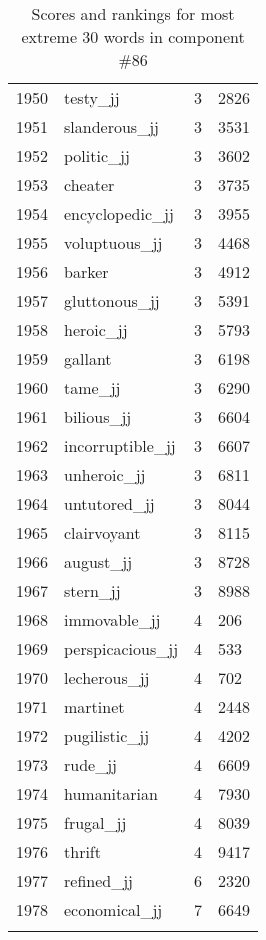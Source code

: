 \begin{longtable}[!htbp]{| rlr@{.}l |}
    1950 & testy\_jj & 3 & 2826 \\
    1951 & slanderous\_jj & 3 & 3531 \\
    1952 & politic\_jj & 3 & 3602 \\
    1953 & cheater & 3 & 3735 \\
    1954 & encyclopedic\_jj & 3 & 3955 \\
    1955 & voluptuous\_jj & 3 & 4468 \\
    1956 & barker & 3 & 4912 \\
    1957 & gluttonous\_jj & 3 & 5391 \\
    1958 & heroic\_jj & 3 & 5793 \\
    1959 & gallant & 3 & 6198 \\
    1960 & tame\_jj & 3 & 6290 \\
    1961 & bilious\_jj & 3 & 6604 \\
    1962 & incorruptible\_jj & 3 & 6607 \\
    1963 & unheroic\_jj & 3 & 6811 \\
    1964 & untutored\_jj & 3 & 8044 \\
    1965 & clairvoyant & 3 & 8115 \\
    1966 & august\_jj & 3 & 8728 \\
    1967 & stern\_jj & 3 & 8988 \\
    1968 & immovable\_jj & 4 & 206 \\
    1969 & perspicacious\_jj & 4 & 533 \\
    1970 & lecherous\_jj & 4 & 702 \\
    1971 & martinet & 4 & 2448 \\
    1972 & pugilistic\_jj & 4 & 4202 \\
    1973 & rude\_jj & 4 & 6609 \\
    1974 & humanitarian & 4 & 7930 \\
    1975 & frugal\_jj & 4 & 8039 \\
    1976 & thrift & 4 & 9417 \\
    1977 & refined\_jj & 6 & 2320 \\
    1978 & economical\_jj & 7 & 6649 \\
    \hline
    \caption{Scores and rankings for most extreme 30 words in component \#86} \\
\end{longtable}
